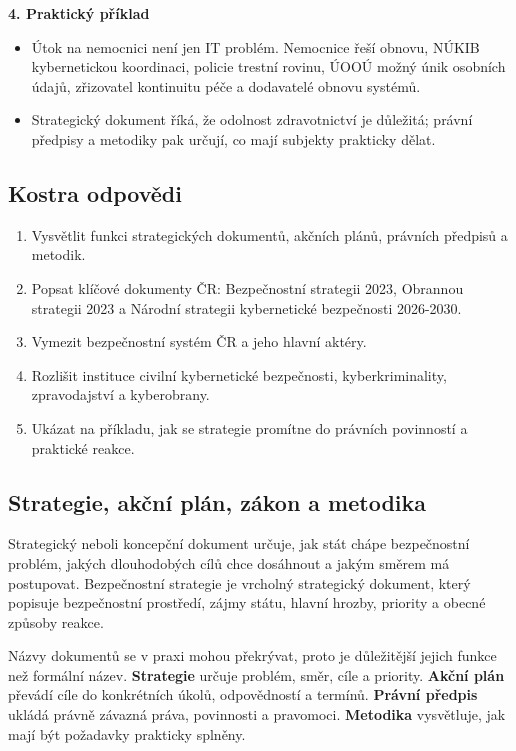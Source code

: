 \textbf{4. Praktický příklad}
\begin{itemize}
  \item Útok na nemocnici není jen IT problém. Nemocnice řeší obnovu, NÚKIB kybernetickou koordinaci, policie trestní rovinu, ÚOOÚ možný únik osobních údajů, zřizovatel kontinuitu péče a dodavatelé obnovu systémů.
  \item Strategický dokument říká, že odolnost zdravotnictví je důležitá; právní předpisy a metodiky pak určují, co mají subjekty prakticky dělat.
\end{itemize}

\subsection*{Kostra odpovědi}
\begin{enumerate}
  \item Vysvětlit funkci strategických dokumentů, akčních plánů, právních předpisů a metodik.
  \item Popsat klíčové dokumenty ČR: Bezpečnostní strategii 2023, Obrannou strategii 2023 a Národní strategii kybernetické bezpečnosti 2026-2030.
  \item Vymezit bezpečnostní systém ČR a jeho hlavní aktéry.
  \item Rozlišit instituce civilní kybernetické bezpečnosti, kyberkriminality, zpravodajství a kyberobrany.
  \item Ukázat na příkladu, jak se strategie promítne do právních povinností a praktické reakce.
\end{enumerate}

\subsection*{Strategie, akční plán, zákon a metodika}
Strategický neboli koncepční dokument určuje, jak stát chápe bezpečnostní problém, jakých dlouhodobých cílů chce dosáhnout a jakým směrem má postupovat. Bezpečnostní strategie je vrcholný strategický dokument, který popisuje bezpečnostní prostředí, zájmy státu, hlavní hrozby, priority a obecné způsoby reakce.

Názvy dokumentů se v praxi mohou překrývat, proto je důležitější jejich funkce než formální název. \textbf{Strategie} určuje problém, směr, cíle a priority. \textbf{Akční plán} převádí cíle do konkrétních úkolů, odpovědností a termínů. \textbf{Právní předpis} ukládá právně závazná práva, povinnosti a pravomoci. \textbf{Metodika} vysvětluje, jak mají být požadavky prakticky splněny.

